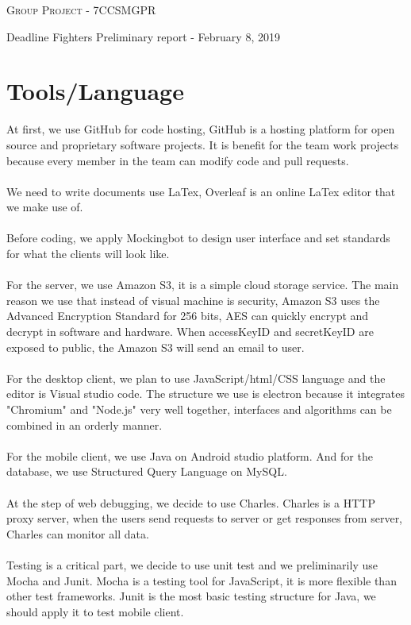 \documentclass[10.25pt,a4paper,oneside]{article}
\begin{document}
{
\begin{center}
	\textsc{Group Project - 7CCSMGPR}
\end{center}
\begin{center}
	\hspace{0.5cm} Deadline Fighters \hspace{0.5 cm} Preliminary report - February 8, 2019
\end{center}

\section{Tools/Language}
At first, we use GitHub for code hosting, GitHub is a hosting platform for open source and proprietary software projects. It is benefit for the team work projects because every member in the team can modify code and pull requests.\\\\
We need to write documents use LaTex, Overleaf is an online LaTex editor that we make use of.\\\\
Before coding, we apply Mockingbot to design user interface and set standards for what the clients will look like.\\\\
For the server, we use Amazon S3, it is a simple cloud storage service. The main reason we use that instead of visual machine is security, Amazon S3 uses the Advanced Encryption Standard for 256 bits, AES can quickly encrypt and decrypt in software and hardware. When accessKeyID and secretKeyID are exposed to public, the Amazon S3 will send an email to user.\\\\
For the desktop client, we plan to use JavaScript/html/CSS language and the editor is Visual studio code. The structure we use is electron because it integrates "Chromium" and "Node.js" very well together, interfaces and algorithms can be combined in an orderly manner.\\\\
For the mobile client, we use Java on Android studio platform. And for the database, we use Structured Query Language on MySQL.\\\\
At the step of web debugging, we decide to use Charles. Charles is a HTTP proxy server, when the users send requests to server or get responses from server, Charles can monitor all data.\\\\
Testing is a critical part, we decide to use unit test and we preliminarily use Mocha and Junit. Mocha is a testing tool for JavaScript, it is more flexible than other test frameworks. Junit is the most basic testing structure for Java, we should apply it to test mobile client.


}
\end{document}
